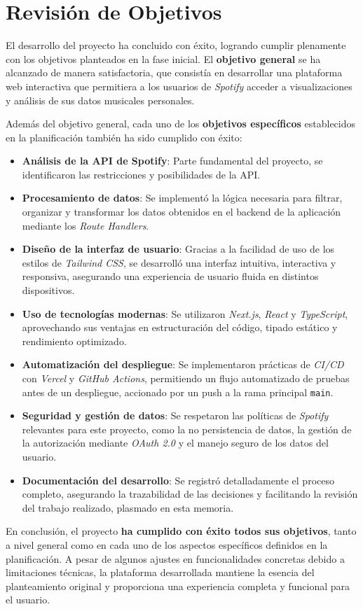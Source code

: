\section{Revisión de Objetivos}

El desarrollo del proyecto ha concluido con éxito, logrando cumplir plenamente con los objetivos planteados en la fase inicial. El \textbf{objetivo general} se ha alcanzado de manera satisfactoria, que consistía en desarrollar una plataforma web interactiva que permitiera a los usuarios de \textit{Spotify} acceder a visualizaciones y análisis de sus datos musicales personales.

Además del objetivo general, cada uno de los \textbf{objetivos específicos} establecidos en la planificación también ha sido cumplido con éxito:

\newpage

\begin{itemize}
    \item \textbf{Análisis de la API de Spotify}: Parte fundamental del proyecto, se identificaron las restricciones y posibilidades de la API.
    \item \textbf{Procesamiento de datos}: Se implementó la lógica necesaria para filtrar, organizar y transformar los datos obtenidos en el backend de la aplicación mediante los \textit{Route Handlers}.
    \item \textbf{Diseño de la interfaz de usuario}: Gracias a la facilidad de uso de los estilos de \textit{Tailwind CSS}, se desarrolló una interfaz intuitiva, interactiva y responsiva, asegurando una experiencia de usuario fluida en distintos dispositivos.
    \item \textbf{Uso de tecnologías modernas}: Se utilizaron \textit{Next.js}, \textit{React} y \textit{TypeScript}, aprovechando sus ventajas en estructuración del código, tipado estático y rendimiento optimizado.
    \item \textbf{Automatización del despliegue}: Se implementaron prácticas de \textit{CI/CD} con \textit{Vercel} y \textit{GitHub Actions}, permitiendo un flujo automatizado de pruebas antes de un despliegue, accionado por un push a la rama principal \texttt{main}.
    \item \textbf{Seguridad y gestión de datos}: Se respetaron las políticas de \textit{Spotify} relevantes para este proyecto, como la no persistencia de datos, la gestión de la autorización mediante \textit{OAuth 2.0} y el manejo seguro de los datos del usuario.
    \item \textbf{Documentación del desarrollo}: Se registró detalladamente el proceso completo, asegurando la trazabilidad de las decisiones y facilitando la revisión del trabajo realizado, plasmado en esta memoria.
\end{itemize}

En conclusión, el proyecto \textbf{ha cumplido con éxito todos sus objetivos}, tanto a nivel general como en cada uno de los aspectos específicos definidos en la planificación. A pesar de algunos ajustes en funcionalidades concretas debido a limitaciones técnicas, la plataforma desarrollada mantiene la esencia del planteamiento original y proporciona una experiencia completa y funcional para el usuario.
